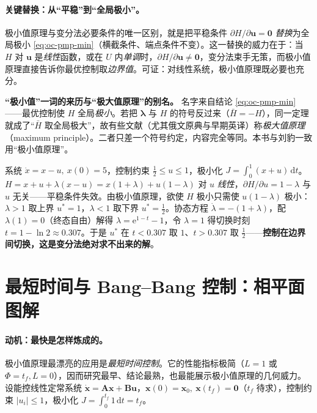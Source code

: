 \paragraph{关键替换：从“平稳”到“全局极小”。}
极小值原理与变分法必要条件的唯一区别，就是把平稳条件 $\partial H/\partial\mathbf u=\mathbf0$ \emph{替换}为全局极小 \cref{eq:oc-pmp-min}（横截条件、端点条件不变）。这一替换的威力在于：当 $H$ 对 $\mathbf u$ 是\emph{线性}函数，或在 $U$ 内\emph{单调}时，$\partial H/\partial\mathbf u\ne\mathbf0$，变分法束手无策，而极小值原理直接告诉你最优控制取\emph{边界值}。可证：对线性系统，极小值原理既必要也充分。

\begin{insight}
\textbf{“极小值”一词的来历与“极大值原理”的别名。}\; 名字来自结论 \cref{eq:oc-pmp-min}——最优控制使 $H$ 全局\emph{极小}。若把 $\boldsymbol\lambda$ 与 $H$ 的符号反过来（$\bar H=-H$），同一定理就成了“$\bar H$ 取全局极大”，故有些文献（尤其俄文原典与早期英译）称\emph{极大值原理}（maximum principle）\cite{pontryagin1962mathematical}。二者只差一个符号约定，内容完全等同。本书与刘豹一致用“极小值原理”。
\end{insight}

\begin{example}\label{ex:oc-pmp-linear}
系统 $\dot x=x-u,\ x(0)=5$，控制约束 $\tfrac12\le u\le1$，极小化 $J=\int_0^1(x+u)\,\mathrm dt$。$H=x+u+\lambda(x-u)=x(1+\lambda)+u(1-\lambda)$ 对 $u$ \emph{线性}，$\partial H/\partial u=1-\lambda$ 与 $u$ 无关——平稳条件失效。由极小值原理，欲使 $H$ 极小只需使 $u(1-\lambda)$ 极小：$\lambda>1$ 取上界 $u^*=1$，$\lambda<1$ 取下界 $u^*=\tfrac12$。协态方程 $\dot\lambda=-(1+\lambda)$，配 $\lambda(1)=0$（终态自由）解得 $\lambda=\mathrm e^{1-t}-1$，令 $\lambda=1$ 得切换时刻 $t=1-\ln2\approx0.307$。于是 $u^*$ 在 $t<0.307$ 取 $1$、$t>0.307$ 取 $\tfrac12$——\textbf{控制在边界间切换，这是变分法绝对求不出来的解}。
\end{example}

\section{最短时间与 Bang--Bang 控制：相平面图解}
\label{sec:oc-bangbang}

\paragraph{动机：最快是怎样炼成的。}
极小值原理最漂亮的应用是\emph{最短时间控制}。它的性能指标极简（$L=1$ 或 $\Phi=t_f,L=0$），因而研究最早、结论最熟，也最能展示极小值原理的几何威力。设能控线性定常系统 $\dot{\mathbf x}=\mathbf A\mathbf x+\mathbf B\mathbf u$，$\mathbf x(0)=\mathbf x_0,\ \mathbf x(t_f)=\mathbf0$（$t_f$ 待求），控制约束 $|u_i|\le1$，极小化 $J=\int_0^{t_f}1\,\mathrm dt=t_f$\cite{liubao2006modern}。

